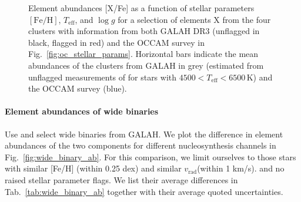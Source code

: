 \documentclass[fleqn,usenatbib,useAMS]{mnras}
\newcommand{\Teff}{$T_\mathrm{eff}$\xspace}
\newcommand{\logg}{$\log g$\xspace}
\newcommand{\feh}{$\mathrm{[Fe/H]}$\xspace}
\newcommand{\vrad}{$v_\mathrm{rad}$\xspace}
\begin{document}
\begin{figure}
\caption{Element abundances [X/Fe] as a function of stellar parameters \feh, \Teff, and \logg for a selection of elements X from the four clusters with information from both GALAH DR3 (unflagged in black, flagged in red) and the OCCAM survey \citep[unflagged data, blue][]{Donor2020} in Fig.~\ref{fig:oc_stellar_params}.  Horizontal bars indicate the mean abundances of the clusters from GALAH in grey (estimated from unflagged measurements of for stars with $4500 < T_\mathrm{eff} < 6500\,\mathrm{K}$) and the OCCAM survey (blue).}
\label{fig:oc_abundances}
\end{figure}

\paragraph*{Element abundances of wide binaries}

Use \citet{ElBadry2018c} and select wide binaries from GALAH. We plot the difference in element abundances of the two components for different nucleosynthesis channels in Fig.~\ref{fig:wide_binary_ab}. For this comparison, we limit ourselves to those stars with similar [Fe/H] (within 0.25 dex) and similar \vrad (within 1 km/s). and no raised stellar parameter flags. We list their average differences in Tab.~\ref{tab:wide_binary_ab} together with their average quoted uncertainties.
\end{document}
